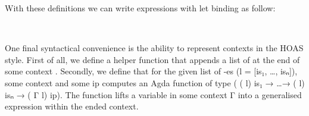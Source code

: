 With these definitions we can write expressions with let binding as follow:
\begin{code}%
%
\>[2]\AgdaFunction{\AgdaUnderscore{}}\AgdaSpace{}%
\AgdaSymbol{:}\AgdaSpace{}%
\AgdaSpace{}%
\AgdaSpace{}%
\AgdaSymbol{(}\AgdaSpace{}%
\AgdaInductiveConstructor{[]}\AgdaSymbol{)}\<%
\\
%
\>[2]\AgdaSymbol{\AgdaUnderscore{}}\AgdaSpace{}%
\AgdaSymbol{=}\AgdaSpace{}%
\AgdaSpace{}%
\AgdaSpace{}%
\AgdaFunction{:=}\AgdaSpace{}%
\AgdaSpace{}%
\AgdaSpace{}%
\AgdaSpace{}%
\AgdaSpace{}%
\AgdaFunction{:=}\AgdaSpace{}%
\AgdaSpace{}%
\AgdaSpace{}%
\AgdaSpace{}%
\AgdaSpace{}%
\AgdaSymbol{(}\AgdaSpace{}%
\AgdaSpace{}%
\AgdaSymbol{)}\AgdaSpace{}%
\AgdaSpace{}%
\<%
\end{code}
One final syntactical convenience is the ability to
represent contexts in the HOAS style.
First of all, we define a helper function  that appends a list of 
at the end of some context .
Secondly, we define  that for the given list of -es
(l = [is₁, \dots, isₙ]), some context  and some 
ip computes an Agda function of type ( (  l) is₁ →
\dots →  (  l) isₙ →  ( Γ l) ip).
The function  lifts a variable in some context Γ into
a generalised expression within the ended context.
